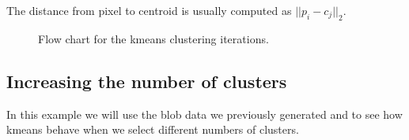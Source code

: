 \documentclass[letterpaper,10pt,english]{sphinxmanual}
\begin{document}
\sphinxAtStartPar
The distance from pixel  to centroid  is usually computed as \(||p_i - c_j||_2\).

\begin{figure}[htbp]
\centering
\capstart

\noindent{}
\caption{Flow chart for the k\sphinxhyphen{}means clustering iterations.}\label{\detokenize{05-AdvancedSegmentation:id5}}\end{figure}


\subsection{Increasing the number of clusters}
\label{\detokenize{05-AdvancedSegmentation:increasing-the-number-of-clusters}}
\sphinxAtStartPar
In this example we will use the blob data we previously generated and to see how k\sphinxhyphen{}means behave when we select different numbers of clusters.

\begin{sphinxVerbatim}[commandchars=\\\{\}]
   

    
          
    \PYG{p}{[}\PYG{p}{]}  
    \PYG{p}{[}\PYG{p}{]}
\end{sphinxVerbatim}
\end{document}
